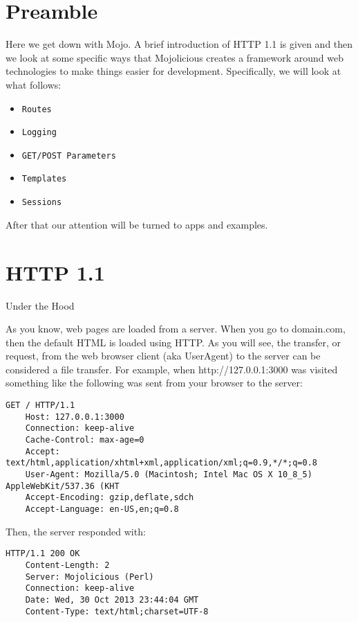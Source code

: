 \documentclass[14pt]{extreport}
\begin{document}
\section{Preamble}

Here we get down with Mojo.  A brief introduction of HTTP 1.1 is given and then
we look at some specific ways that Mojolicious creates a framework around
web technologies to make things easier for development.  Specifically, we will look
at what follows:

\begin{itemize} \itemsep1pt \parskip0pt 
\item \verb|Routes|
\item \verb|Logging|
\item \verb|GET/POST Parameters|
\item \verb|Templates|
\item \verb|Sessions|
\end{itemize}

After that our attention will be turned to apps and examples.

\section{HTTP 1.1}

{\Large Under the Hood}

As you know, web pages are loaded from a server. When you go to domain.com,
then the default HTML is loaded using HTTP.  As you will see, the transfer, or
request, from the web browser client (aka UserAgent) to the server can be
considered a file transfer. For example, when http://127.0.0.1:3000 was visited
something like the following was sent from your browser to the server:

\begin{lstlisting}[style=BlockStyle]
    GET / HTTP/1.1
    Host: 127.0.0.1:3000
    Connection: keep-alive
    Cache-Control: max-age=0
    Accept: text/html,application/xhtml+xml,application/xml;q=0.9,*/*;q=0.8
    User-Agent: Mozilla/5.0 (Macintosh; Intel Mac OS X 10_8_5) AppleWebKit/537.36 (KHT
    Accept-Encoding: gzip,deflate,sdch
    Accept-Language: en-US,en;q=0.8
\end{lstlisting}

Then, the server responded with:

\begin{lstlisting}[style=BlockStyle]
    HTTP/1.1 200 OK
    Content-Length: 2
    Server: Mojolicious (Perl)
    Connection: keep-alive
    Date: Wed, 30 Oct 2013 23:44:04 GMT
    Content-Type: text/html;charset=UTF-8
\end{lstlisting}
\end{document}

